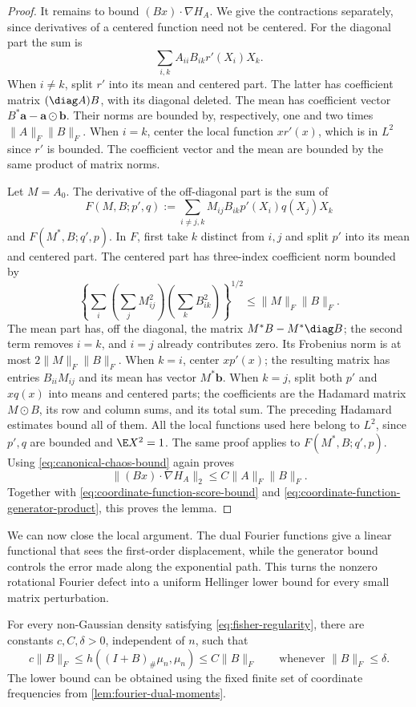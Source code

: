 \begin{proof}
It remains to bound $(Bx)\cdot\nabla H_A$.  We give the
contractions separately, since derivatives of a centered
function need not be centered.  For the diagonal part the sum
is
\[
 \sum_{i,k}A_{ii}B_{ik}r'(X_i)X_k.
\]
When $i\ne k$, split $r'$ into its mean and centered part.
The latter has coefficient matrix
$(\diag A)B$, with its diagonal
deleted.  The mean has coefficient vector
$B^*\mathbf a-\mathbf a\mathbin{\odot}\mathbf b$.
Their norms are bounded by, respectively, one and two times
$\|A\|_F\|B\|_F$.  When $i=k$, center the local function
$xr'(x)$, which is in $L^2$ since $r'$ is bounded.  The
coefficient vector and the mean are bounded by the same
product of matrix norms.

Let $M=A_0$.  The derivative of the
off-diagonal part is the sum of
\[
 F(M,B;p',q):=
 \sum_{i\ne j,k}M_{ij}B_{ik}p'(X_i)q(X_j)X_k
\]
and $F(M^*,B;q',p)$.  In $F$, first take $k$ distinct
from $i,j$ and split $p'$ into its mean and centered part.
The centered part has three-index coefficient norm bounded by
\[
 \left\{\sum_i\left(\sum_jM_{ij}^2\right)
                    \left(\sum_kB_{ik}^2\right)\right\}^{1/2}
 \le\|M\|_F\|B\|_F.
\]
The mean part has, off the diagonal, the matrix
$M^*B-M^*\diag B$;
the second term removes $i=k$, and $i=j$ already contributes
zero.  Its Frobenius norm is at most $2\|M\|_F\|B\|_F$.
When $k=i$, center $xp'(x)$; the resulting matrix has entries
$B_{ii}M_{ij}$ and its mean has vector
$M^*\mathbf b$.  When $k=j$, split both
$p'$ and $xq(x)$ into means and centered parts; the coefficients
are the Hadamard matrix $M\mathbin{\odot}B$, its row and column
sums, and its total sum.  The preceding Hadamard estimates
bound all of them.  All the local functions used here belong
to $L^2$, since $p',q$ are bounded and $\E X^2=1$.
The same proof applies to $F(M^*,B;q',p)$.
Using \eqref{eq:canonical-chaos-bound} again proves
\[
 \|(Bx)\cdot\nabla H_A\|_2\le C\|A\|_F\|B\|_F.
\]
Together with \eqref{eq:coordinate-function-score-bound} and
\eqref{eq:coordinate-function-generator-product}, this proves the lemma.
\end{proof}

We can now close the local argument.
The dual Fourier functions give a linear functional that sees the
first-order displacement, while the generator bound controls the error made
along the exponential path.
This turns the nonzero rotational Fourier defect into a uniform Hellinger lower bound
for every small matrix perturbation.

\begin{proposition}
\label{prop:local-fisher-hellinger}
For every non-Gaussian density satisfying
\eqref{eq:fisher-regularity}, there are constants
$c,C,\delta>0$, independent of $n$, such that
\begin{equation}
 c\|B\|_F\le h((I+B)_\#\mu_n,\mu_n)
             \le C\|B\|_F
 \qquad\text{whenever }\|B\|_F\le\delta.
 \label{eq:local-matrix-hellinger}
\end{equation}
The lower bound can be obtained using the fixed finite set of
coordinate frequencies from \cref{lem:fourier-dual-moments}.
\end{proposition}

